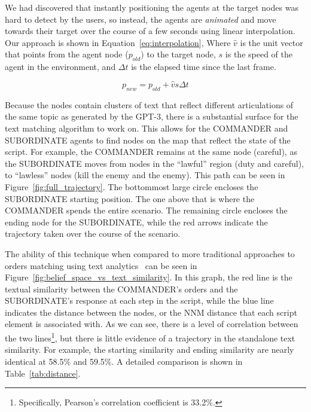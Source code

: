 \documentclass[11pt,dvipdfm]{article}
\begin{document}
We had discovered that instantly positioning the agents at the target nodes was hard to detect by the users, so instead, the agents are \textit{animated} and move towards their target over the course of a few seconds using linear interpolation. Our approach is shown in Equation~\ref{eq:interpolation}, Where $\hat{v}$ is the unit vector that points from the agent node ($p_{old})$ to the target node, $s$ is the speed of the agent in the environment, and $\Delta t$ is the elapsed time since the last frame. 

\begin{equation} \label{eq:interpolation}
    p_{new} = p_{old} + \hat{v}s\Delta t
\end{equation}

Because the nodes contain clusters of text that reflect different articulations of the same topic as generated by the GPT-3, there is a substantial surface for the text matching algorithm to work on. This allows for the COMMANDER and SUBORDINATE agents to find nodes on the map that reflect the state of the script. For example, the COMMANDER remains at the same node (careful), as the SUBORDINATE moves from nodes in the \enquote{lawful} region (duty and careful), to \enquote{lawless} nodes (kill the enemy and the enemy). This path can be seen in Figure~\ref{fig:full_trajectory}. The bottommost large circle encloses the SUBORDINATE starting position. The one above that is where the COMMANDER spends the entire scenario. The remaining circle encloses the ending node for the SUBORDINATE, while the red arrows indicate the trajectory taken over the course of the scenario.

The ability of this technique when compared to more traditional approaches to orders matching using text analytics~\cite{kewley2002computational} can be seen in Figure~\ref{fig:belief_space_vs_text_similarity}. In this graph, the red line is the textual similarity between the COMMANDER's orders and the SUBORDINATE's response at each step in the script, while the blue line indicates the distance between the nodes, or the NNM distance that each script element is associated with. As we can see, there is a level of correlation between the two lines\footnote{Specifically, Pearson's correlation coefficient is 33.2\%.}, but there is little evidence of a trajectory in the standalone text similarity. For example, the starting similarity and ending similarity are nearly identical at 58.5\% and 59.5\%. A detailed comparison is shown in Table~\ref{tab:distance}.
\end{document}
